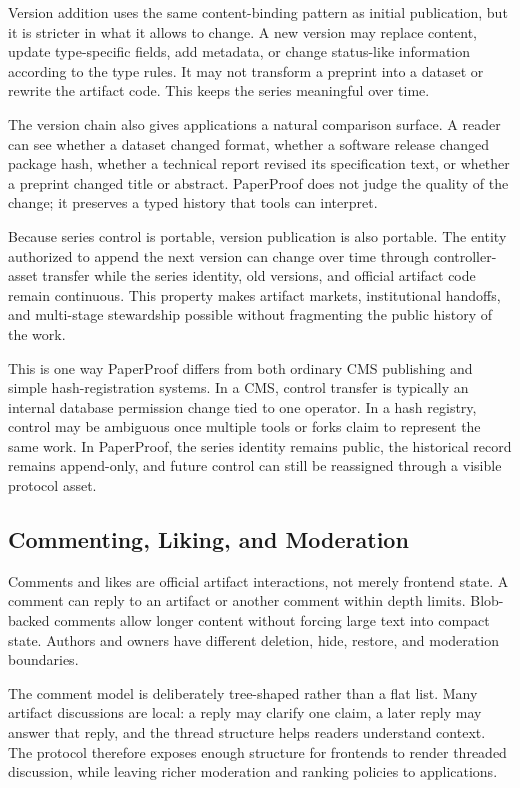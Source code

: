 \documentclass[journal]{IEEEtran}
\begin{document}
Version addition uses the same content-binding pattern as initial publication, but it is stricter in what it allows to change. A new version may replace content, update type-specific fields, add metadata, or change status-like information according to the type rules. It may not transform a preprint into a dataset or rewrite the artifact code. This keeps the series meaningful over time.

The version chain also gives applications a natural comparison surface. A reader can see whether a dataset changed format, whether a software release changed package hash, whether a technical report revised its specification text, or whether a preprint changed title or abstract. PaperProof does not judge the quality of the change; it preserves a typed history that tools can interpret.

Because series control is portable, version publication is also portable. The
entity authorized to append the next version can change over time through
controller-asset transfer while the series identity, old versions, and official
artifact code remain continuous. This property makes artifact markets,
institutional handoffs, and multi-stage stewardship possible without fragmenting
the public history of the work.

This is one way PaperProof differs from both ordinary CMS publishing and simple
hash-registration systems. In a CMS, control transfer is typically an internal
database permission change tied to one operator. In a hash registry, control may
be ambiguous once multiple tools or forks claim to represent the same work. In
PaperProof, the series identity remains public, the historical record remains
append-only, and future control can still be reassigned through a visible
protocol asset.

\subsection{Commenting, Liking, and Moderation}

Comments and likes are official artifact interactions, not merely frontend state. A comment can reply to an artifact or another comment within depth limits. Blob-backed comments allow longer content without forcing large text into compact state. Authors and owners have different deletion, hide, restore, and moderation boundaries.

The comment model is deliberately tree-shaped rather than a flat list. Many artifact discussions are local: a reply may clarify one claim, a later reply may answer that reply, and the thread structure helps readers understand context. The protocol therefore exposes enough structure for frontends to render threaded discussion, while leaving richer moderation and ranking policies to applications.
\end{document}
